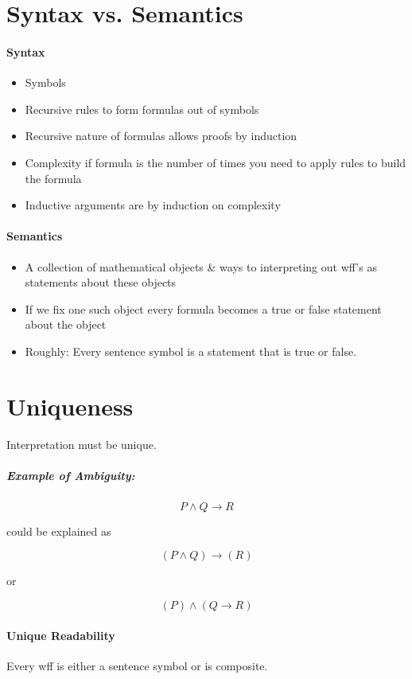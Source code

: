 \documentclass[11pt]{article}
\begin{document}
	\section{Syntax vs. Semantics}
	\paragraph{Syntax}
	\begin{itemize}
		\item Symbols
		\item Recursive rules to form formulas out of symbols
		\item Recursive nature of formulas allows proofs by induction
		\item Complexity if formula is the number of times you need to apply rules to build the formula
		\item Inductive arguments are by induction on complexity
	\end{itemize}
	\paragraph{Semantics}
	\begin{itemize}
		\item A collection of mathematical objects \& ways to interpreting out wff's as statements about these objects
		\item If we fix one such object every formula becomes a true or false statement about the object
		\item Roughly: Every sentence symbol is a statement that is true or false.
	\end{itemize}
	
	\section{Uniqueness}
	Interpretation must be unique.
	
	\subparagraph{Example of Ambiguity:}
	\[P \wedge Q \rightarrow R\]
	
	could be explained as 
	
	\[(P \wedge Q) \rightarrow (R)\]
	
	or 
	
	\[(P) \wedge (Q \rightarrow R)\]
	
	\paragraph{Unique Readability}
	Every wff is either a sentence symbol or is composite.
	
\end{document}
